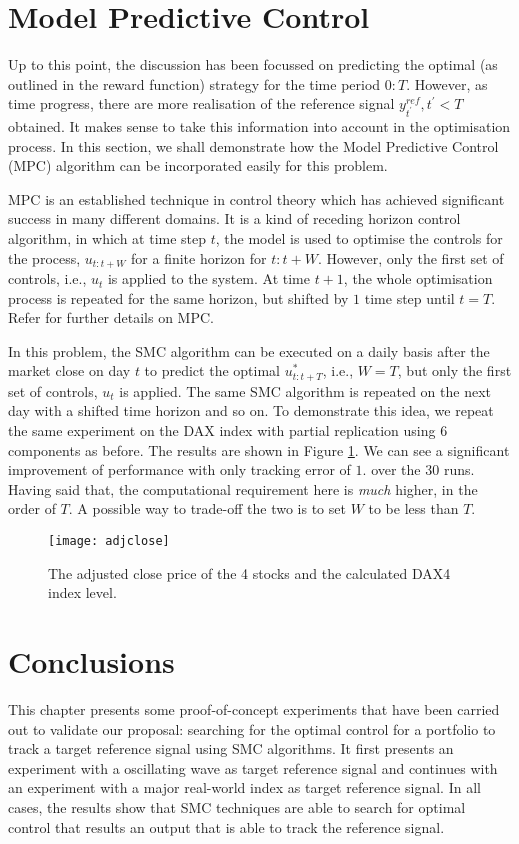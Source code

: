 \section{Model Predictive Control}
Up to this point, the discussion has been focussed on predicting the optimal (as outlined in the reward function) strategy for the time period $0:T$. However, as time progress, there are more realisation of the reference signal $y^{ref}_{t^\prime}, t^\prime < T$ obtained. It makes sense to take this information into account in the optimisation process. In this section, we shall demonstrate how the Model Predictive Control (MPC) algorithm can be incorporated easily for this problem.

MPC is an established technique in control theory which has achieved significant success in many different domains. It is a kind of receding horizon control algorithm, in which at time step $t$, the model is used to optimise the controls for the process, $u_{t:t+W}$ for a finite horizon for $t:t+W$. However, only the first set of controls, i.e., $u_{t}$ is applied to the system. At time $t+1$, the whole optimisation process is repeated for the same horizon, but shifted by $1$ time step until $t=T$. Refer \cite{GCE89} for further details on MPC. 

In this problem, the SMC algorithm can be executed on a daily basis after the market close on day $t$ to predict the optimal $u^*_{t:t+T}$, i.e., $W=T$, but only the first set of controls, $u_t$ is applied. The same SMC algorithm is repeated on the next day with a shifted time horizon and so on. To demonstrate this idea, we repeat the same experiment on the DAX index with partial replication using $6$ components as before. The results are shown in Figure \ref{fig:mpc}. We can see a significant improvement of performance with only tracking error of $1.$ over the $30$ runs. Having said that, the computational requirement here is \emph{much} higher, in the order of $T$. A possible way to trade-off the two is to set $W$ to be less than $T$.
 
\begin{figure}[htbp]
\centering
\texttt{[image: adjclose]}
\caption{The adjusted close price of the 4 stocks and the calculated DAX4 index level.}
\label{fig:mpc}
\end{figure}

\section{Conclusions}
\label{sec:conclusion5}
This chapter presents some proof-of-concept experiments that have been
carried out to validate our proposal: searching for the optimal control for a portfolio to track a target reference signal using SMC algorithms. It first presents an experiment with a oscillating wave as target reference signal and continues with an experiment with a major real-world index as target reference signal. In all cases, the results show that SMC techniques are able to search for optimal control that results an output that is able to track the reference signal.

